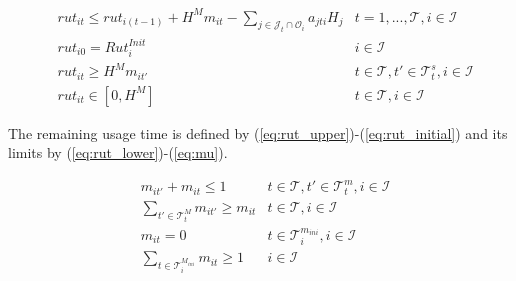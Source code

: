 \documentclass[a4paper,onecolumn,fleqn]{article}
\begin{document}
    \begin{align}
         & rut_{it} \leq rut_{i(t-1)} + H^{M} m_{it} - \sum_{j \in \mathcal{J}_t \cap \mathcal{O}_i} a_{jti} H_j 
            & t =1, ..., \mathcal{T}, i \in \mathcal{I} \label{eq:rut_upper}\\
        & rut_{i0} = Rut^{Init}_i
               & i \in \mathcal{I} \label{eq:rut_initial}\\
        & rut_{it} \geq H^{M} m_{it'}
                & t \in \mathcal{T}, t' \in \mathcal{T}^{s}_t, i \in \mathcal{I}\label{eq:rut_lower}\\ 
        & rut_{it} \in [0,H^{M}]
                & t \in \mathcal{T}, i \in \mathcal{I} \label{eq:mu}              
    \end{align}

    The remaining usage time is defined by (\ref{eq:rut_upper})-(\ref{eq:rut_initial}) and its limits by (\ref{eq:rut_lower})-(\ref{eq:mu}). 

    \begin{align}
        & m_{it'} + m_{it} \leq 1
          & t \in \mathcal{T}, t' \in \mathcal{T}^{m}_t, i \in \mathcal{I}\label{eq:ret_min}\\ 
        & \sum_{t' \in \mathcal{T}^{M}_t} m_{it'} \geq  m_{it}
          & t \in \mathcal{T}, i \in \mathcal{I}\label{eq:ret_max}\\
        & m_{it} = 0
          & t \in \mathcal{T}^{m_{ini}}_i, i \in \mathcal{I}\label{eq:ret_min_init} \\
        & \sum_{t \in \mathcal{T}^{M_{ini}}_i} m_{it} \geq  1 
          & i \in \mathcal{I}\label{eq:ret_max_init}
    \end{align}
\end{document}
